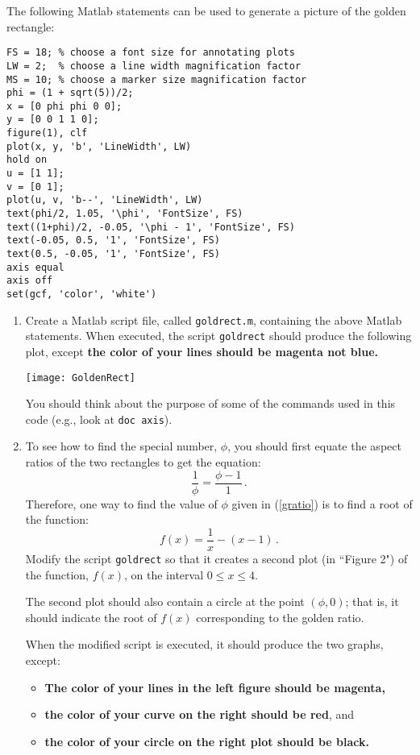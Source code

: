 \documentclass[12pt]{article}
\begin{document}
\begin{enumerate}
The following Matlab statements can be used to generate a 
picture of the golden rectangle:
{\footnotesize
\begin{verbatim}
FS = 18; % choose a font size for annotating plots
LW = 2;  % choose a line width magnification factor
MS = 10; % choose a marker size magnification factor
phi = (1 + sqrt(5))/2;
x = [0 phi phi 0 0];
y = [0 0 1 1 0];
figure(1), clf
plot(x, y, 'b', 'LineWidth', LW)
hold on
u = [1 1];
v = [0 1];
plot(u, v, 'b--', 'LineWidth', LW)
text(phi/2, 1.05, '\phi', 'FontSize', FS)
text((1+phi)/2, -0.05, '\phi - 1', 'FontSize', FS)
text(-0.05, 0.5, '1', 'FontSize', FS)
text(0.5, -0.05, '1', 'FontSize', FS)
axis equal
axis off
set(gcf, 'color', 'white')
\end{verbatim}
}
\begin{enumerate}
\item
Create a Matlab script file, called {\tt goldrect.m}, containing
the above Matlab statements.  When executed, the script {\tt goldrect}
should produce the following plot, except {\bf the color of your lines should be magenta not blue.}

\begin{center}
\texttt{[image: GoldenRect]}
\end{center}

You should think about the purpose of some of the commands used in this code (e.g., look at {\tt doc axis}).
\item
To see how to find the special number, $\phi$, you should first equate the aspect
ratios of the two rectangles to get the equation:
$$
  \frac{1}{\phi} = \frac{\phi - 1}{1}\,.
$$
Therefore, one way to find the value of $\phi$ given in (\ref{gratio}) is
to find a root of the function:
$$
  f(x) = \frac{1}{x} - (x - 1)\,.
$$
Modify the script {\tt goldrect} so that it creates a second plot (in ``Figure 2")
of the function, $f(x)$, on the interval $0 \leq x \leq 4$.

The second plot should also contain a circle at the point $(\phi, 0)$;
that is, it should indicate the root of $f(x)$ corresponding to the
golden ratio.

When the modified script is executed, it should produce the two graphs, except:
\begin{itemize}
\item
{\bf The color of your lines in the left figure should be magenta,}
\item
{\bf the color of your curve on the right should be red}, and
\item
{\bf the color of your circle on the right plot should be black.}
\end{itemize}


\end{enumerate}
\end{enumerate}
\end{document}
